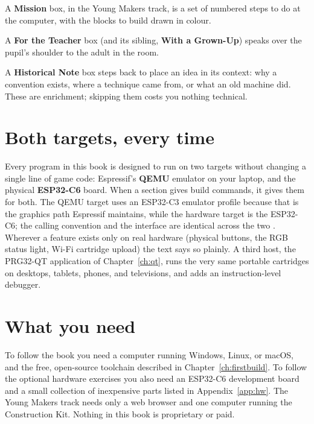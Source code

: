 \begin{prgmission}
A \textbf{Mission} box, in the Young Makers track, is a set of numbered steps to
do at the computer, with the blocks to build drawn in colour.
\end{prgmission}

\begin{prgteacher}
A \textbf{For the Teacher} box (and its sibling, \textbf{With a Grown-Up})
speaks over the pupil's shoulder to the adult in the room.
\end{prgteacher}

\begin{prgaside}
A \textbf{Historical Note} box steps back to place an idea in its context: why a
convention exists, where a technique came from, or what an old machine did. These
are enrichment; skipping them costs you nothing technical.
\end{prgaside}

\section*{Both targets, every time}

Every program in this book is designed to run on two targets without changing a
single line of game code: Espressif's \textbf{QEMU} emulator on your laptop, and
the physical \textbf{ESP32\nobreakdash-C6} board. When a section gives build commands, it
gives them for both. The QEMU target uses an ESP32\nobreakdash-C3 emulator profile because
that is the \riscv graphics path Espressif maintains, while the hardware target
is the ESP32\nobreakdash-C6; the \riscv calling convention and the \prg interface are
identical across the two \citep{prg32qemu}. Wherever a feature exists only on real
hardware (physical buttons, the RGB status light, Wi\nobreakdash-Fi cartridge
upload) the text says so plainly. A third host, the PRG32-QT application of
Chapter~\ref{ch:qt}, runs the very same portable cartridges on desktops, tablets,
phones, and televisions, and adds an instruction-level debugger.

\section*{What you need}

To follow the book you need a computer running Windows, Linux, or macOS, and the
free, open-source toolchain described in Chapter~\ref{ch:firstbuild}. To follow
the optional hardware exercises you also need an ESP32\nobreakdash-C6 development
board and a small collection of inexpensive parts listed in
Appendix~\ref{app:hw}. The Young Makers track needs only a web browser and one
computer running the Construction Kit. Nothing in this book is proprietary or
paid.

